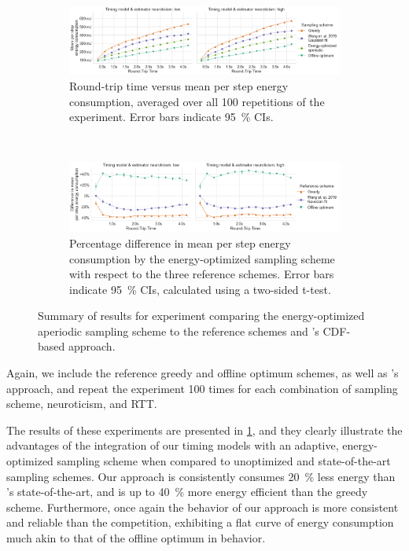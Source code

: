 \begin{figure}
    \centering
    \begin{subfigure}[t]{\textwidth}
        \centering
        \includegraphics[width=\textwidth]{figs/new_model/energy_optimization.png}
        \caption{%
            Round-trip time versus mean per step energy consumption, averaged over all \num{100} repetitions of the experiment.
            Error bars indicate \SI{95}{\percent} \glspl{CI}.
        }
    \end{subfigure}\\
    \medskip
    \begin{subfigure}[t]{\textwidth}
        \centering
        \includegraphics[width=\textwidth]{figs/new_model/energy_optimization_diff.png}
        \caption{%
            Percentage difference in mean per step energy consumption by the energy-optimized sampling scheme with respect to the three reference schemes.
            Error bars indicate \SI{95}{\percent} \glspl{CI}, calculated using a two-sided t-test.
        }
    \end{subfigure}
    \caption{%
        Summary of results for experiment comparing the energy-optimized aperiodic sampling scheme to the reference schemes and \textcite{wang2019towards}'s \gls{CDF}-based approach.
    }\label{fig:optimization:energy}
\end{figure}

Again, we include the reference greedy and offline optimum schemes, as well as \textcite{wang2019towards}'s approach, and repeat the experiment \num{100} times for each combination of sampling scheme, neuroticism, and \gls{RTT}.

The results of these experiments are presented in \cref{fig:optimization:energy}, and they clearly illustrate the advantages of the integration of our timing models with an adaptive, energy-optimized sampling scheme when compared to unoptimized and state-of-the-art sampling schemes.
Our approach is consistently consumes \SI{20}{\percent} less energy than \textcite{wang2019towards}'s state-of-the-art, and is up to \SI{40}{\percent} more energy efficient than the greedy scheme.
Furthermore, once again the behavior of our approach is more consistent and reliable than the competition, exhibiting a flat curve of energy consumption much akin to that of the offline optimum in behavior.
